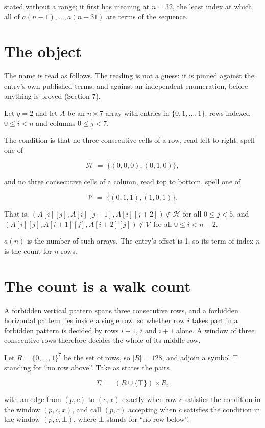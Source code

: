 \documentclass[11pt]{article}
\theoremstyle{definition}
\begin{document}
stated without a range; it first has meaning at $n = 32$, the least index at which all of $a(n-1),\dots,a(n-31)$ are terms of the sequence.

\section{The object}

The name is read as follows. The reading is not a guess: it is pinned against the entry's own published terms, and against an independent enumeration, before anything is proved (Section 7).

Let $q = 2$ and let $A$ be an $n \times 7$ array with entries in $\{0,1,\dots,1\}$, rows indexed $0 \le i < n$ and columns $0 \le j < 7$.

The condition is that no three consecutive cells of a row, read left to right, spell one of

\[\mathcal{H} \;=\; \{(0,0,0), (0,1,0)\},\]

and no three consecutive cells of a column, read top to bottom, spell one of

\[\mathcal{V} \;=\; \{(0,1,1), (1,0,1)\}.\]

That is, $(A[i][j],A[i][j{+}1],A[i][j{+}2]) \notin \mathcal{H}$ for all $0 \le j < 5$, and $(A[i][j],A[i{+}1][j],A[i{+}2][j]) \notin \mathcal{V}$ for all $0 \le i < n-2$.

$a(n)$ is the number of such arrays. The entry's offset is 1, so its term of index $n$ is the count for $n$ rows.

\section{The count is a walk count}

A forbidden vertical pattern spans three consecutive rows, and a forbidden horizontal pattern lies inside a single row, so whether row $i$ takes part in a forbidden pattern is decided by rows $i-1$, $i$ and $i+1$ alone. A window of three consecutive rows therefore decides the whole of its middle row.

Let $R = \{0,\dots,1\}^{7}$ be the set of rows, so $|R| = 128$, and adjoin a symbol $\top$ standing for ``no row above''. Take as states the pairs

\[\Sigma \;=\; (R \cup \{\top\}) \times R,\]

with an edge from $(p,c)$ to $(c,x)$ exactly when row $c$ satisfies the condition in the window $(p,c,x)$, and call $(p,c)$ accepting when $c$ satisfies the condition in the window $(p,c,\bot)$, where $\bot$ stands for ``no row below''.
\end{document}
